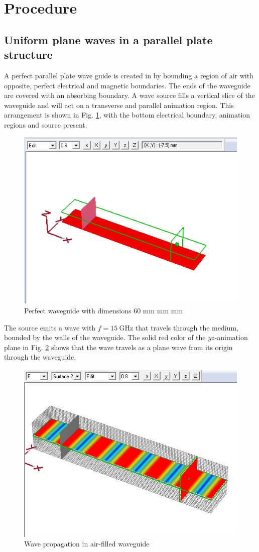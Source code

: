 \section{Procedure}\label{sec:procedure}
\subsection{Uniform plane waves in a parallel plate structure}
A perfect parallel plate wave guide is created in \mefisto by bounding a region of air with opposite, perfect electrical and magnetic boundaries.
The ends of the waveguide are covered with an absorbing boundary.
A wave source fills a vertical slice of the waveguide and will act on a transverse and parallel animation region.
This arrangement is shown in Fig. \ref{fig:waveguide}, with the bottom electrical boundary, animation regions and source present.

\begin{figure}[tbph]
	\centering
	\includegraphics[width=0.7\linewidth]{graphics/waveguide}
	\caption{Perfect waveguide with dimensions 60 mm  mm  mm}
	\label{fig:waveguide}
\end{figure}

The source emits a wave with $f = \SI{15}{\giga\hertz}$ that travels through the medium, bounded by the walls of the waveguide.
The solid red color of the $yz$-animation plane in Fig. \ref{fig:Task1-2dsurface} shows that the wave travels as a plane wave from its origin through the waveguide.

\begin{figure}[tbph]
	\centering
	\includegraphics[width=0.7\linewidth]{graphics/Task1-2dsurface}
	\caption{Wave propagation in air-filled waveguide}
	\label{fig:Task1-2dsurface}
\end{figure}


